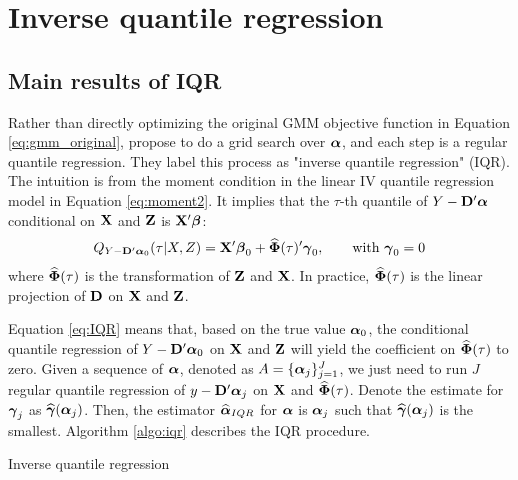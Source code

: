 \section{Inverse quantile regression} \label{sec:iqr_method}

\subsection{Main results of IQR}	
Rather than directly optimizing the original GMM objective function in Equation
\ref{eq:gmm_original}, \cite{Chernozhukov2006} propose to do a grid search over
$\boldsymbol{\alpha}$, and each step is a regular quantile regression. They label this process
as "inverse quantile regression" (IQR). The intuition is from the moment
condition in the linear IV quantile regression model in Equation
\ref{eq:moment2}. It implies that the $\tau$-th quantile of $Y -
\mathbf{D}'\boldsymbol{\alpha}$ conditional on $\mathbf{X}$ and $\mathbf{Z}$ is $\mathbf{X}'\boldsymbol{\beta}$:
\begin{align}
Q_{Y - \mathbf{D}'\boldsymbol{\alpha}_0}(\tau |X, Z) = \mathbf{X}' \boldsymbol{\beta}_0 +
\widehat{\boldsymbol{\Phi}}(\tau)'\boldsymbol{\gamma}_0, \qquad \text{with } \boldsymbol{\gamma}_0 = 0 \label{eq:IQR}
\end{align}
where $\widehat{\boldsymbol{\Phi}}(\tau)$ is the transformation of $\mathbf{Z}$ and $\mathbf{X}$. In
practice, $\widehat{\boldsymbol{\Phi}}(\tau)$ is the linear projection of $\mathbf{D}$ on $\mathbf{X}$ and
$\mathbf{Z}$.

Equation \ref{eq:IQR} means that, based on the true value $\boldsymbol{\alpha}_0$, the
conditional quantile regression of $Y-\mathbf{D}'\boldsymbol{\alpha}_0$ on $\mathbf{X}$ and $\mathbf{Z}$ will
yield the coefficient on $\widehat{\boldsymbol{\Phi}}(\tau)$ to zero.  Given a sequence of
$\boldsymbol{\alpha}$, denoted as $A = \{\boldsymbol{\alpha}_j\}_{j=1}^J$, we just need to run $J$
regular quantile regression of $ y - \mathbf{D}'\boldsymbol{\alpha}_j$ on $\mathbf{X}$ and
$\widehat{\boldsymbol{\Phi}}(\tau)$.  Denote the estimate for $\boldsymbol{\gamma}_j$ as
$\widehat{\boldsymbol{\gamma}}(\boldsymbol{\alpha}_j)$.  Then, the estimator $\widehat{\boldsymbol{\alpha}}_{IQR}$ for
$\boldsymbol{\alpha}$ is $\boldsymbol{\alpha}_j$ such that $\widehat{\boldsymbol{\gamma}}(\boldsymbol{\alpha}_j)$ is the smallest.
Algorithm \ref{algo:iqr} describes the IQR procedure.

\begin{algorithm}[H]
\caption{Inverse quantile regression} \label{algo:iqr}
\begin{enumerate}
    
\end{enumerate}
\end{algorithm}

